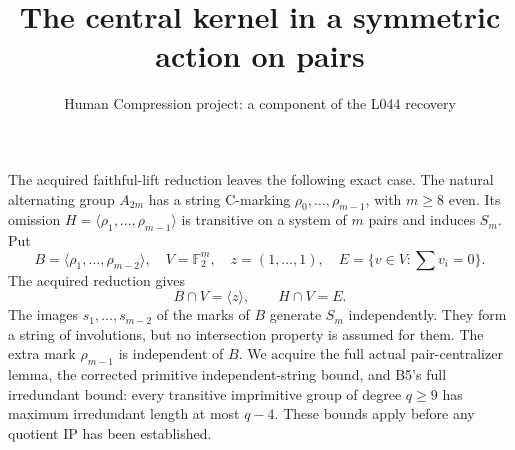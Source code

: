 \documentclass[11pt,a4paper]{article}
\title{The central kernel in a symmetric action on pairs}
\author{Human Compression project: a component of the L044 recovery}
\date{}
\newcommand{\gen}[1]{\langle#1\rangle}
\begin{document}
\maketitle
The acquired faithful-lift reduction leaves the following exact case.
The natural alternating group $A_{2m}$ has a string C-marking
$\rho_0,\ldots,\rho_{m-1}$, with $m\ge8$ even. Its omission
$H=\gen{\rho_1,\ldots,\rho_{m-1}}$ is transitive on a system of
$m$ pairs and induces $S_m$. Put
\[
 B=\gen{\rho_1,\ldots,\rho_{m-2}},\quad
 V=\mathbb F_2^m,\quad z=(1,\ldots,1),
 \quad E=\{v\in V:\textstyle\sum v_i=0\}.
\]
The acquired reduction gives
\[
 B\cap V=\gen z,\qquad H\cap V=E.                 \tag{1}
\]
The images $s_1,\ldots,s_{m-2}$ of the marks of $B$ generate
$S_m$ independently. They form a string of involutions, but
no intersection property is assumed for them. The extra mark
$\rho_{m-1}$ is independent of $B$. We acquire the full actual
pair-centralizer lemma, the corrected primitive independent-string
bound, and B5's full irredundant bound: every transitive imprimitive
group of degree $q\ge9$ has maximum irredundant length at most $q-4$.
These bounds apply before any quotient IP has been established.
\end{document}
